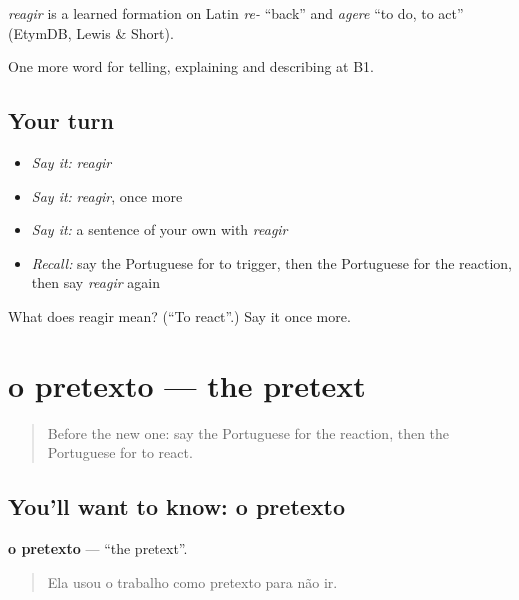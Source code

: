 \begin{cousinweb}
\emph{reagir} is a learned formation on Latin \emph{re-} \textquotedblleft{}back\textquotedblright{} and \emph{agere} \textquotedblleft{}to do, to act\textquotedblright{} (EtymDB, Lewis \& Short).
\end{cousinweb}

\begin{grammarlens}[title={What you've built}]
One more word for telling, explaining and describing at B1.
\end{grammarlens}

\subsection*{Your turn}
\begin{itemize}
\raggedright
  \item \emph{Say it:} \emph{reagir}
  \item \emph{Say it:} \emph{reagir}, once more
  \item \emph{Say it:} a sentence of your own with \emph{reagir}
  \item \emph{Recall:} say the Portuguese for to trigger, then the Portuguese for the reaction, then say \emph{reagir} again
\end{itemize}

\begin{tcolorbox}[breakable,colback=teal!4,colframe=teal!35!black,title={Before you move on}]
What does reagir mean? (\textquotedblleft{}To react\textquotedblright{}.) Say it once more.
\end{tcolorbox}
\section[o pretexto]{o pretexto — the pretext}

\label{lesson:PT-C352-pretexto}



\begin{quote}
Before the new one: say the Portuguese for the reaction, then the Portuguese for to react.
\end{quote}

\subsection*{You'll want to know: o pretexto}
\textbf{o pretexto} — \textquotedblleft{}the pretext\textquotedblright{}.

\begin{quote}
Ela usou o trabalho como pretexto para não ir.
\end{quote}

